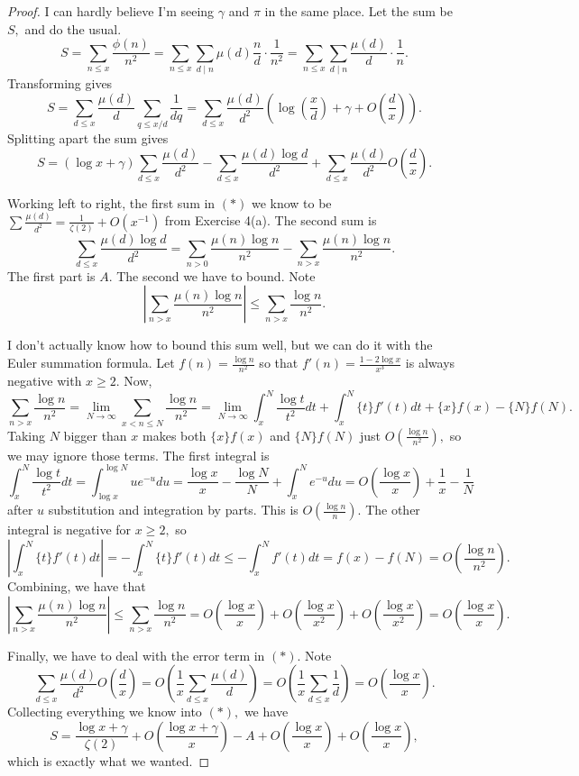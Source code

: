 \begin{proof}
I can hardly believe I'm seeing $\gamma$ and $\pi$ in the same place. Let the sum be $S,$ and do the usual.
\[S=\sum_{n\le x}\frac{\phi(n)}{n^2}=\sum_{n\le x}\sum_{d\mid n}\mu(d)\frac nd\cdot\frac1{n^2}=\sum_{n\le x}\sum_{d\mid n}\frac{\mu(d)}d\cdot\frac1n.\]
Transforming gives
\[S=\sum_{d\le x}\frac{\mu(d)}d\sum_{q\le x/d}\frac1{dq}=\sum_{d\le x}\frac{\mu(d)}{d^2}\left(\log\left(\frac xd\right)+\gamma+O\left(\frac dx\right)\right).\]
Splitting apart the sum gives
\[S=(\log x+\gamma)\sum_{d\le x}\frac{\mu(d)}{d^2}-\sum_{d\le x}\frac{\mu(d)\log d}{d^2}+\sum_{d\le x}\frac{\mu(d)}{d^2}O\left(\frac dx\right).\tag{$*$}\]

Working left to right, the first sum in $(*)$ we know to be $\sum\frac{\mu(d)}{d^2}=\frac1{\zeta(2)}+O\left(x^{-1}\right)$ from Exercise 4(a). The second sum is
\[\sum_{d\le x}\frac{\mu(d)\log d}{d^2}=\sum_{n>0}\frac{\mu(n)\log n}{n^2}-\sum_{n>x}\frac{\mu(n)\log n}{n^2}.\]
The first part is $A.$ The second we have to bound. Note
\[\left|\sum_{n>x}\frac{\mu(n)\log n}{n^2}\right|\le\sum_{n>x}\frac{\log n}{n^2}.\]

I don't actually know how to bound this sum well, but we can do it with the Euler summation formula. Let $f(n)=\frac{\log n}{n^2}$ so that $f'(n)=\frac{1-2\log x}{x^3}$ is always negative with $x\ge2.$ Now,
\[\sum_{n>x}\frac{\log n}{n^2}=\lim_{N\to\infty}\sum_{x<n\le N}\frac{\log n}{n^2}=\lim_{N\to\infty}\int_x^N\frac{\log t}{t^2}dt+\int_x^N\{t\}f'(t)dt+\{x\}f(x)-\{N\}f(N).\]
Taking $N$ bigger than $x$ makes both $\{x\}f(x)$ and $\{N\}f(N)$ just $O\left(\frac{\log n}{n^2}\right),$ so we may ignore those terms. The first integral is
\[\int_x^N\frac{\log t}{t^2}dt=\int_{\log x}^{\log N}ue^{-u}du=\frac{\log x}x-\frac{\log N}N+\int_x^Ne^{-u}du=O\left(\frac{\log x}x\right)+\frac1x-\frac1N\]
after $u$ substitution and integration by parts. This is $O\left(\frac{\log n}n\right).$ The other integral is negative for $x\ge2,$ so
\[\left|\int_x^N\{t\}f'(t)dt\right|=-\int_x^N\{t\}f'(t)dt\le-\int_x^Nf'(t)dt=f(x)-f(N)=O\left(\frac{\log n}{n^2}\right).\]
Combining, we have that
\[\left|\sum_{n>x}\frac{\mu(n)\log n}{n^2}\right|\le\sum_{n>x}\frac{\log n}{n^2}=O\left(\frac{\log x}x\right)+O\left(\frac{\log x}{x^2}\right)+O\left(\frac{\log x}{x^2}\right)=O\left(\frac{\log x}x\right).\]

Finally, we have to deal with the error term in $(*).$ Note
\[\sum_{d\le x}\frac{\mu(d)}{d^2}O\left(\frac dx\right)=O\left(\frac1x\sum_{d\le x}\frac{\mu(d)}d\right)=O\left(\frac1x\sum_{d\le x}\frac1d\right)=O\left(\frac{\log x}x\right).\]
Collecting everything we know into $(*),$ we have
\[S=\frac{\log x+\gamma}{\zeta(2)}+O\left(\frac{\log x+\gamma}x\right)-A+O\left(\frac{\log x}x\right)+O\left(\frac{\log x}x\right),\]
which is exactly what we wanted.
\end{proof}

